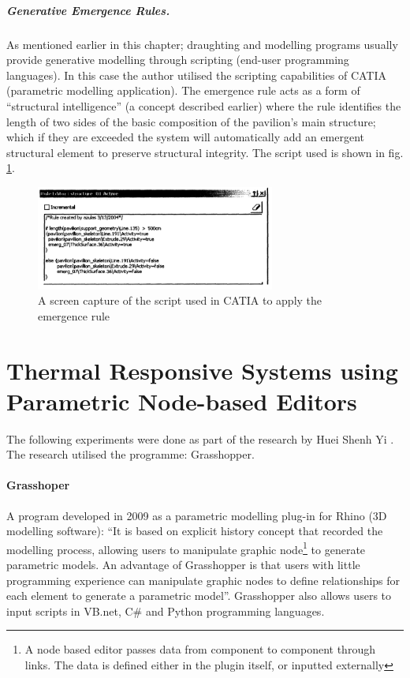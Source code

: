 \subparagraph{Generative Emergence Rules.} As mentioned earlier in this chapter; draughting and modelling programs usually provide generative modelling through scripting (end-user programming languages). In this case the author \cite{zulas04} utilised the scripting capabilities of CATIA (parametric modelling application). The emergence rule acts as a form of ``structural intelligence'' (a concept described earlier) where the rule identifies the length of two sides of the basic composition of the pavilion's main structure; which if they are exceeded the system will automatically add an emergent structural element to preserve structural integrity. The script used is shown in fig. \ref{fig:EmergRuleScr}.

\begin{figure}[htbp]
\centering
\includegraphics[width=0.7\textwidth]{./Images/14-EmergRuleScr}
\caption[Emergence Rule Script]{A screen capture of the script used in CATIA to apply the emergence rule \cite{zulas04}}
\label{fig:EmergRuleScr}
\end{figure}

\section{Thermal Responsive Systems using Parametric Node-based Editors}
\label{sec:NodeBased}

The following experiments were done as part of the research by Huei Shenh Yi \cite{yi09}. The research utilised the programme: Grasshopper.

\paragraph{Grasshoper}\mbox{}

A program developed in 2009 as a parametric modelling plug-in for Rhino (3D modelling software): ``It is based on explicit history concept that recorded the modelling process, allowing users to manipulate graphic node\footnote{A node based editor passes data from component to component through links. The data is defined either in the plugin itself, or inputted externally} to generate parametric models. An advantage of Grasshopper is that users with little programming experience can manipulate graphic nodes to define relationships for each element to generate a parametric model''\cite{yi09}. Grasshopper also allows users to input scripts in VB.net, C\# and Python programming languages.

